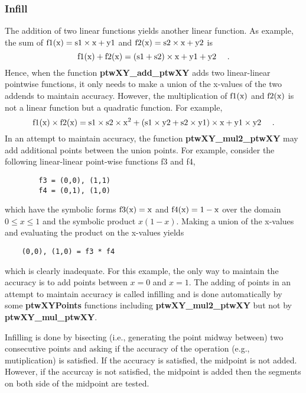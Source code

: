\documentclass[11pt]{article}
\newcommand{\highlight}[1]{{\bf #1}}
\begin{document}
\subsubsection{Infill} \label{Infill}
The addition of two linear functions yields another linear function. As example, the sum of $\rm{f1}(x) = s1 \times x + y1$
and $\rm{f2}(x) = s2 \times x + y2$ is
\begin{equation}
    \rm{f1}(x) + \rm{f2}(x) = ( s1 + s2 ) \times x + y1 + y2 \ \ \ \ .
\end{equation}
Hence, when the function \highlight{ptwXY\_add\_ptwXY}
adds two linear-linear pointwise functions, it only needs to make a union of the x-values of the two addends to maintain accuracy.
However, the multiplication of $\rm{f1}(x)$ and $\rm{f2}(x)$ is not a linear function but a quadratic function. For example,
\begin{equation}
\rm{f1}(x) \times \rm{f2}(x) = s1 \times s2 \times x^2 + ( s1 \times y2 + s2 \times y1 ) \times x + y1 \times y2 \ \ \ \ .
\end{equation}
In an attempt to maintain accuracy, the
function \highlight{ptwXY\_mul2\_ptwXY} may add additional points between the union points. For example, consider the following
linear-linear point-wise functions f3 and f4,
\begin{verbatim}
        f3 = (0,0), (1,1)
        f4 = (0,1), (1,0)
\end{verbatim}
which have the symbolic forms $\rm{f3}(x) = x$ and $\rm{f4}(x) = 1 - x$ over the domain $0 \le x \le 1$ and the symbolic
product $x ( 1 - x )$. Making a union of the x-values and evaluating the product on the x-values yields
\begin{verbatim}
    (0,0), (1,0) = f3 * f4
\end{verbatim}
which is clearly inadequate. For this example, the only way to maintain the accuracy is to add points between $x = 0$ and $x = 1$. The adding of
points in an attempt to maintain accuracy is called infilling and is done automatically by some \highlight{ptwXYPoints} functions
including \highlight{ptwXY\_mul2\_ptwXY} but not by \highlight{ptwXY\_mul\_ptwXY}.

Infilling is done by bisecting (i.e., generating the point midway between) two consecutive points and asking if 
the accuracy of the operation (e.g., mutiplication) is satisfied. If the accuracy is satisfied, the midpoint is not added. However, if 
the accurcay is not satisfied, the midpoint is added then the segments on both side of the midpoint are tested. 
\end{document}
